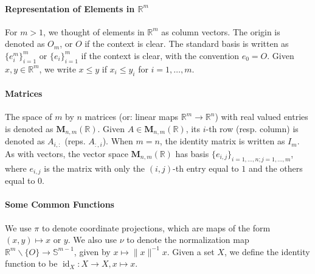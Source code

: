 \paragraph{Representation of Elements in $\mathbb{R}^m$}For $m>1$, we thought of elements in $\mathbb{R}^m$ as column vectors. The origin is denoted as $O_m$, or $O$ if the context is clear. The standard basis is written as $\{e_i^m\}_{i=1}^m$ or $\{e_i\}_{i=1}^m$ if the context is clear, with the convention $e_0=O$. Given $x,y\in \mathbb{R}^m$, we write $x\leq y$ if $x_i\leq y_i$ for $i=1,\dotsc,m$.

\paragraph{Matrices}The space of $m$ by $n$ matrices (or: linear maps $\mathbb{R}^m\to \mathbb{R}^n$) with real valued entries is denoted as $\mathbf{M}_{n,m}(\mathbb{R})$. Given $A\in \mathbf{M}_{n,m}(\mathbb{R})$, its $i$-th row (resp. column) is denoted as $A_{i,:}$ (reps. $A_{:,i}$). When $m=n$, the identity matrix is written as $I_m$. As with vectors, the vector space $\mathbf{M}_{n,m}(\mathbb{R})$ has basis $\{e_{i,j}\}_{i=1,\dotsc,n; j=1,\dotsc, m}$, where $e_{i,j}$ is the matrix with only the $(i,j)$-th entry equal to $1$ and the others equal to $0$.

\paragraph{Some Common Functions}We use $\pi$ to denote coordinate projections, which are maps of the form $(x,y)\mapsto x$ or $y$. We also use $\nu$ to denote the normalization map $\mathbb{R}^{m}\smallsetminus \{O\}\to \mathbb{S}^{m-1}$, given by $x\mapsto \|x\|^{-1}x$. Given a set $X$, we define the identity function to be $\operatorname{id}_X:X\to X,x\mapsto x$.

